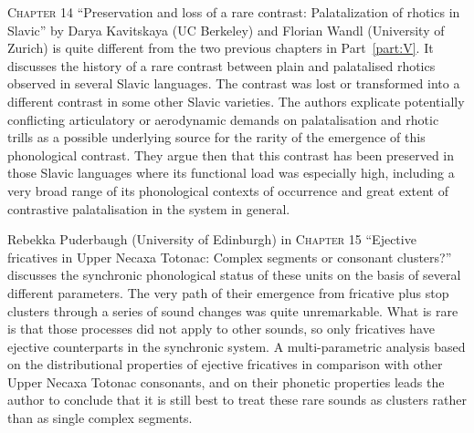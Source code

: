 \documentclass[output=paper]{langscibook}
\begin{document}
\textsc{Chapter 14} “Preservation and loss of a rare contrast: Palatalization of rhotics in Slavic” by Darya Kavitskaya (UC Berkeley) and Florian Wandl (University of Zurich) is quite different from the two previous chapters in Part~\ref{part:V}. It discusses the history of a rare contrast between plain and palatalised rhotics observed in several Slavic languages. The contrast was lost or transformed into a different contrast in some other Slavic varieties. The authors explicate potentially conflicting articulatory or aerodynamic demands on palatalisation and rhotic trills as a possible underlying source for the rarity of the emergence of this phonological contrast. They argue then that this contrast has been preserved in those Slavic languages where its functional load was especially high, including a very broad range of its phonological contexts of occurrence and great extent of contrastive palatalisation in the system in general.

Rebekka Puderbaugh (University of Edinburgh) in \textsc{Chapter 15} “Ejective fricatives in Upper Necaxa Totonac: Complex segments or consonant clusters?” discusses the synchronic phonological status of these units on the basis of several different parameters. The very path of their emergence from fricative plus stop clusters through a series of sound changes was quite unremarkable. What is rare is that those processes did not apply to other sounds, so only fricatives have ejective counterparts in the synchronic system. A multi-parametric analysis based on the distributional properties of ejective fricatives in comparison with other Upper Necaxa Totonac consonants, and on their phonetic properties leads the author to conclude that it is still best to treat these rare sounds as clusters rather than as single complex segments.
\end{document}
